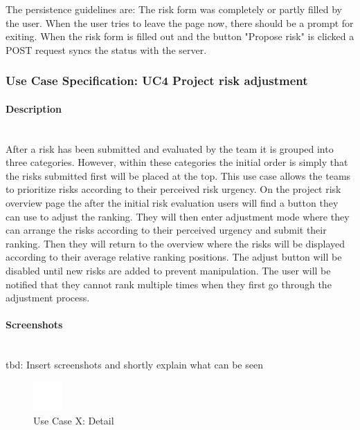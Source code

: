 \noindent
The persistence guidelines are: 
\newline
\noindent
The risk form was completely or partly filled by the user. When the user tries to leave the page now, there should be a prompt for exiting. When the risk form is filled out and the button "Propose risk" is clicked a POST request syncs the status with the server.

\newpage
\subsubsection{Use Case Specification: \ac{UC}4 Project risk adjustment}
\label{sec:domainBbe}

\paragraph*{Description}\mbox{}\\
After a risk has been submitted and evaluated by the team it is grouped into three categories. However, within these categories the initial order is simply that the risks submitted first will be placed at the top. This use case allows the teams to prioritize risks according to their perceived risk urgency. On the project risk overview page the after the initial risk evaluation users will find a button they can use to adjust the ranking. They will then enter adjustment mode where they can arrange the risks according to their perceived urgency and submit their ranking. Then they will return to the overview where the risks will be displayed according to their average relative ranking positions. The adjust button will be disabled until new risks are added to prevent manipulation. The user will be notified that they cannot rank multiple times when they first go through the adjustment process. 

\paragraph*{Screenshots}\mbox{}\\
tbd: Insert screenshots and shortly explain what can be seen

\begin{figure}[h] 
	\centering
	\includegraphics[width=0.1\textwidth]{Content/Domain/placeholder.png}
	\caption{Use Case X: Detail}
	\label{fig:label4}
\end{figure}

